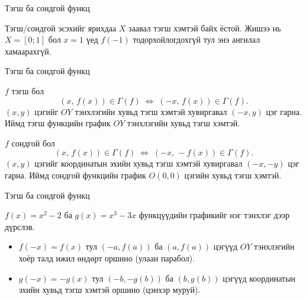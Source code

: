 \begin{frame}[allowframebreaks]{Тэгш ба сондгой функц}
\begin{remark}
Тэгш/сондгой эсэхийг ярихдаа $X$ заавал тэгш хэмтэй байх ёстой. Жишээ нь
$X=[0;1]$ бол $x=1$ үед $f(-1)$ тодорхойлогдохгүй тул энэ ангилал хамаарахгүй.
\end{remark}
\end{frame}

\begin{frame}[allowframebreaks]{Тэгш ба сондгой функц}
\begin{remark}
$f$ тэгш бол
\[
  (x,\,f(x))\in\Gamma(f) \;\Longleftrightarrow\; (-x,\,f(x))\in\Gamma(f).
\]
$(x,y)$ цэгийг $OY$ тэнхлэгийн хувьд тэгш хэмтэй хувиргавал $(-x,y)$ цэг гарна.
Иймд тэгш функцийн график $OY$ тэнхлэгийн хувьд тэгш хэмтэй.

$f$ сондгой бол
\[
  (x,\,f(x))\in\Gamma(f) \;\Longleftrightarrow\; (-x,\,-f(x))\in\Gamma(f).
\]
$(x,y)$ цэгийг координатын эхийн хувьд тэгш хэмтэй хувиргавал $(-x,-y)$ цэг гарна.
Иймд сондгой функцийн график $O(0,0)$ цэгийн хувьд тэгш хэмтэй.
\end{remark}
\end{frame}

\begin{frame}[allowframebreaks]{Тэгш ба сондгой функц}
\begin{example}
$f(x)=x^2-2$ ба $g(x)=x^3-3x$ функцүүдийн графикийг нэг тэнхлэг дээр дүрслэв.
\begin{itemize}
  \item $f(-x)=f(x)$ тул $(-a,f(a))$ ба $(a,f(a))$ цэгүүд $OY$ тэнхлэгийн хоёр талд
        ижил өндөрт оршино (улаан парабол).
  \item $g(-x)=-g(x)$ тул $(-b,-g(b))$ ба $(b,g(b))$ цэгүүд координатын эхийн хувьд
        тэгш хэмтэй оршино (цэнхэр муруй).
\end{itemize}
\begin{center}
\begin{fitbox}\end{fitbox}
\end{center}
\end{example}
\end{frame}


